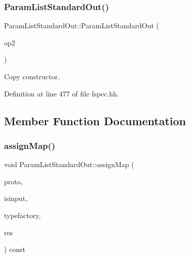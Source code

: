 \subsubsection{\texorpdfstring{ParamListStandardOut()}{ParamListStandardOut()}\hspace{0.1cm}{\footnotesize\ttfamily [2/2]}}
{\footnotesize\ttfamily Param\+List\+Standard\+Out\+::\+Param\+List\+Standard\+Out (\begin{DoxyParamCaption}\item[{const \mbox{\hyperlink{class_param_list_standard_out}{Param\+List\+Standard\+Out}} \&}]{op2 }\end{DoxyParamCaption})\hspace{0.3cm}{\ttfamily [inline]}}



Copy constructor. 



Definition at line 477 of file fspec.\+hh.



\subsection{Member Function Documentation}
\mbox{\label{class_param_list_standard_out_af50fd192a944d885223b263e5c31a69e}} 
\subsubsection{\texorpdfstring{assignMap()}{assignMap()}}
{\footnotesize\ttfamily void Param\+List\+Standard\+Out\+::assign\+Map (\begin{DoxyParamCaption}\item[{const vector$<$ \mbox{\hyperlink{class_datatype}{Datatype}} $\ast$ $>$ \&}]{proto,  }\item[{bool}]{isinput,  }\item[{\mbox{\hyperlink{class_type_factory}{Type\+Factory}} \&}]{typefactory,  }\item[{vector$<$ \mbox{\hyperlink{struct_parameter_pieces}{Parameter\+Pieces}} $>$ \&}]{res }\end{DoxyParamCaption}) const\hspace{0.3cm}{\ttfamily [virtual]}}




